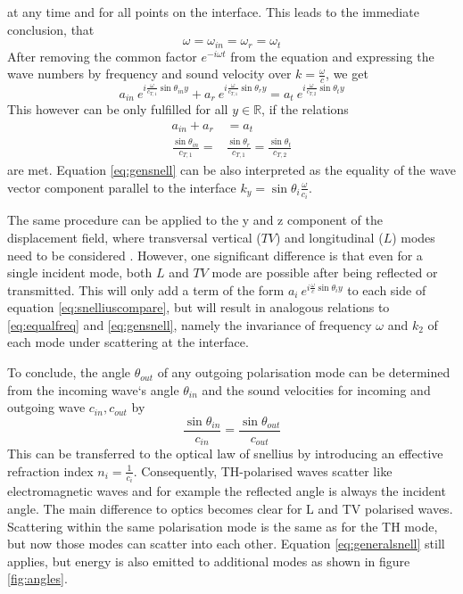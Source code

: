 at any time and for all points on the interface. This leads to the immediate
conclusion, that
\begin{equation} \label{eq:equalfreq}
    \omega = \omega_{in} = \omega_r = \omega_t
\end{equation}
After removing the common factor $e^{-i\omega t}$ from the equation and
expressing the wave numbers by frequency and sound velocity over
$k = \frac{\omega}{c}$, we get
\begin{equation} \label{eq:snelliuscompare}
    a_{in}\ e^{i \frac{ \omega}{c_{T,1}}\sin\theta_{in} y}
    + a_{r}\ e^{i \frac{ \omega}{c_{T,1}}\sin\theta_{r} y}
    = a_{t}\ e^{i \frac{ \omega}{c_{T,2}}\sin\theta_{t} y}
\end{equation}
This however can be only fulfilled for all $y \in \mathbb{R}$, if the relations
\begin{align}
    a_{in} + a_r                      & = a_t                            \\
    \frac{\sin\theta_{in}}{c_{T,1}} = & \frac{\sin\theta_{r}}{c_{T,1}} =
    \frac{\sin\theta_{t}}{c_{T,2}} \label{eq:gensnell}
\end{align}
are met. Equation \ref{eq:gensnell} can be also interpreted as the equality
of the wave vector component parallel to the interface
$k_y=\sin\theta_i \frac{\omega}{c_i}$.

The same procedure can be applied to the y and z component of the displacement
field, where transversal vertical ($TV$) and longitudinal ($L$) modes need to
be considered \cite[185]{achenbach1973wave}. However, one significant
difference is that even for a single incident mode, both $L$ and $TV$ mode are
possible after being reflected or transmitted. This will only add a term of the
form $ a_{i}\ e^{i \frac{ \omega}{c}\sin\theta_{i} y}$ to each side of equation
\ref{eq:snelliuscompare}, but will result in analogous relations to
\ref{eq:equalfreq} and \ref{eq:gensnell}, namely the invariance of frequency
$\omega$ and $k_2$ of each mode under scattering at the interface.

To conclude, the angle $\theta_{out}$ of any outgoing polarisation mode can be
determined from the incoming wave`s angle $\theta_{in}$ and the sound
velocities for incoming and outgoing wave $c_{in}, c_{out}$ by
\begin{equation} \label{eq:generalsnell}
    \frac{\sin\theta_{in}}{c_{in}} =  \frac{\sin\theta_{out}}{c_{out}}
\end{equation}
This can be transferred to the optical law of snellius by introducing an
effective refraction index $n_i = \frac{1}{c_i}$. Consequently, TH-polarised
waves scatter like electromagnetic waves and for example the reflected angle is
always the incident angle.
The main difference to optics becomes clear for L and TV polarised waves.
Scattering within the same polarisation mode is the same as for the TH mode,
but now those modes can scatter into each other. Equation \ref{eq:generalsnell}
still applies, but energy is also emitted to additional modes as shown in
figure \ref{fig:angles}.

